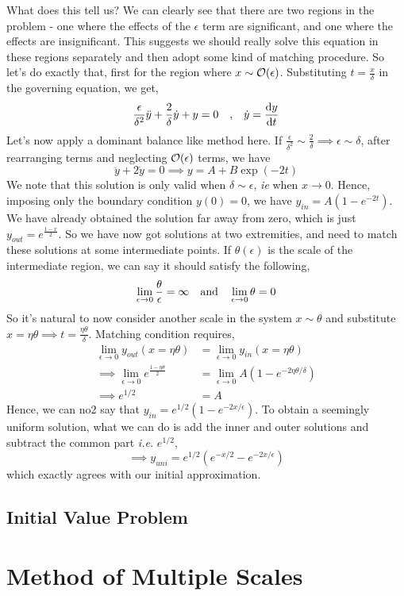 \documentclass[a4paper,11pt]{article}
\begin{document}
What does this tell us? We can clearly see that there are two regions in the problem - one where the effects of the $ \epsilon $ term are significant, and one where the effects are insignificant. This suggests we should really solve this equation in these regions separately and then adopt some kind of matching procedure. So let's do exactly that, first for the region where $ x \sim \order{\epsilon} $. Substituting $ t = \frac{x}{\delta} $ in the governing equation, we get,
\begin{equation*}
\dfrac{\epsilon}{\delta^2} \ddot{y} + \dfrac{2}{\delta} \dot{y} + y = 0 \qq{,} \dot{y} = \dv{y}{t}
\end{equation*}
Let's now apply a dominant balance like method here. If $ \frac{\epsilon}{\delta^2} \sim \frac{2}{\delta}  \implies \epsilon \sim \delta$, after rearranging terms and neglecting $ \order{\epsilon} $ terms, we have
\begin{equation*}
\ddot{y} + 2 \dot{y} = 0 \implies y = A + B \exp(-2t) 
\end{equation*}
We note that this solution is only valid when $ \delta \sim \epsilon $, \textit{ie} when $ x \rightarrow 0 $. Hence, imposing only the boundary condition $ y(0) = 0 $, we have $ y_{in} = A(1 - e^{-2t}) $. We have already obtained the solution far away from zero, which is just $ y_{out} =e^{\frac{1-x}{2}}  $. So we have now got solutions at two extremities, and need to match these solutions at some intermediate points. If $ \theta(\epsilon) $ is the scale of the intermediate region, we can say it should satisfy the following,
\begin{equation*}
\lim\limits_{\epsilon \rightarrow 0} \dfrac{\theta}{\epsilon} = \infty \qq{and} \lim\limits_{\epsilon \rightarrow 0} \theta = 0
\end{equation*}
So it's natural to now consider another scale in the system $ x \sim \theta $ and substitute $ x = \eta \theta \implies t = \frac{\eta \theta}{\delta}$. Matching condition requires,
\begin{align*}
\lim\limits_{\epsilon \rightarrow 0} y_{out}(x=\eta \theta) &= \lim\limits_{\epsilon \rightarrow 0} y_{in}( x =\eta \theta) \\
\implies \lim\limits_{\epsilon \rightarrow 0}e^{\frac{1 - \eta \theta}{2}} &= \lim\limits_{\epsilon \rightarrow 0}A( 1 - e^{-2 \eta \theta/\delta}) \\
\implies e^{1/2} &= A
\end{align*}
Hence, we can no2 say that $ y_{in} =   e^{1/2}(1 - e^{-2x/\epsilon})$. To obtain a seemingly uniform solution, what we can do is add the inner and outer solutions and subtract the common part \textit{i.e.} $ e^{1/2} $,
\begin{equation*}
\implies y_{uni} = e^{1/2}(e^{-x/2} - e^{-2x/\epsilon})
\end{equation*}
which exactly agrees with our initial approximation.

\subsection{Initial Value Problem}

\section{Method of Multiple Scales}
\end{document}
